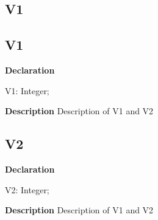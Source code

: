 \documentclass{report}
\newif\ifpdf
\begin{document}
\subsection*{\large{\textbf{V1}}\normalsize\hspace{1ex}\hrulefill}
\else
\subsection*{V1}
\fi
\label{ok_back_comment-V1}
\begin{list}{}{
\setlength{\itemindent}{0cm}
\setlength{\listparindent}{0cm}
\setlength{\leftmargin}{\evensidemargin}
\addtolength{\leftmargin}{\tmplength}
\settowidth{\labelsep}{X}
\addtolength{\leftmargin}{\labelsep}
\setlength{\labelwidth}{\tmplength}
}
\item[\textbf{Declaration}\hfill]
\ifpdf
\begin{flushleft}
\fi
\begin{ttfamily}
V1: Integer;\end{ttfamily}

\ifpdf
\end{flushleft}
\fi

\par
\item[\textbf{Description}]
Description of V1 and V2

\end{list}
\ifpdf
\subsection*{\large{\textbf{V2}}\normalsize\hspace{1ex}\hrulefill}
\else
\subsection*{V2}
\fi
\label{ok_back_comment-V2}
\begin{list}{}{
\setlength{\itemindent}{0cm}
\setlength{\listparindent}{0cm}
\setlength{\leftmargin}{\evensidemargin}
\addtolength{\leftmargin}{\tmplength}
\settowidth{\labelsep}{X}
\addtolength{\leftmargin}{\labelsep}
\setlength{\labelwidth}{\tmplength}
}
\item[\textbf{Declaration}\hfill]
\ifpdf
\begin{flushleft}
\fi
\begin{ttfamily}
V2: Integer;\end{ttfamily}

\ifpdf
\end{flushleft}
\fi

\par
\item[\textbf{Description}]
Description of V1 and V2

\end{list}
\end{document}
